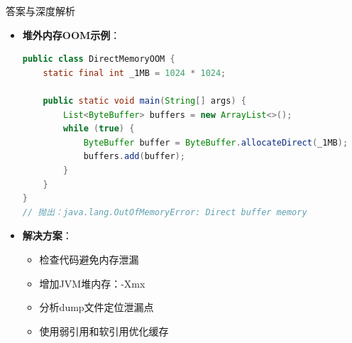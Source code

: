 \documentclass[12pt, a4paper]{ctexart}
\begin{document}
\begin{enumerate}[label=\textbf{\arabic*.}]
\begin{bluebox}{答案与深度解析}
\begin{itemize}[leftmargin=*, nosep, label={}]
\begin{itemize}[label={}, leftmargin=*, nosep]
\begin{lstlisting}[language=Java]
    public static void main(String[] args) {
        while (true) {
            list.add(new byte[1024 * 1024]); // 持续分配1MB
            // 静态集合持有引用，GC无法回收，最终OOM
        }
    }
}
// 运行一段时间后抛出：java.lang.OutOfMemoryError: Java heap space
				            \end{lstlisting}
				            \item \textbf{堆外内存OOM示例}：
				                  \begin{lstlisting}[language=Java]
public class DirectMemoryOOM {
    static final int _1MB = 1024 * 1024;

    public static void main(String[] args) {
        List<ByteBuffer> buffers = new ArrayList<>();
        while (true) {
            ByteBuffer buffer = ByteBuffer.allocateDirect(_1MB);
            buffers.add(buffer);
        }
    }
}
// 抛出：java.lang.OutOfMemoryError: Direct buffer memory
				            \end{lstlisting}
				            \item \textbf{解决方案}：
				                  \begin{itemize}[label={}, nosep]
					                  \item 检查代码避免内存泄漏
					                  \item 增加JVM堆内存：-Xmx
					                  \item 分析dump文件定位泄漏点
					                  \item 使用弱引用和软引用优化缓存
				                  \end{itemize}
			            \end{itemize}


\end{itemize}
\end{bluebox}
\end{enumerate}
\end{document}
